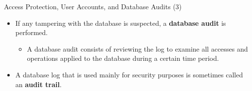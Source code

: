\begin{frame}{Access Protection, User Accounts, and Database Audits (3)}
    \Large
    
    \begin{itemize}
        \vspace{-1.5cm}
        
        \item If any tampering with the database is suspected, a \textbf{database audit} is performed.
        
        \begin{itemize}
            \large
            \setlength{\itemsep}{0.2cm}
            
            \item A database audit consists of reviewing the log to examine all accesses and operations applied to the database during a certain time period.
        \end{itemize}
        
        \vspace{0.4cm}
        
        \item A database log that is used mainly for security purposes is sometimes called an \textbf{audit trail}.
        
    \end{itemize}
\end{frame}
